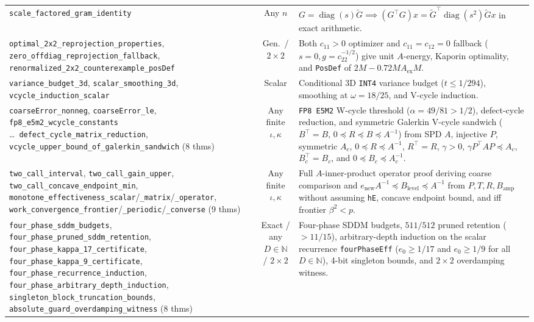 \documentclass[10pt]{article}
\begin{document}
\begin{table}[t]
\begin{tabular}{@{}p{}cp{}@{}}
\texttt{scale\_factored\_gram\_identity} & Any $n$ & $G = \operatorname{diag}(s)\tilde{G} \implies (G^\top G)x = \tilde{G}^\top\operatorname{diag}(s^2)\tilde{G}x$ in exact arithmetic. \\
\texttt{optimal\_2x2\_reprojection\_properties}, \texttt{zero\_offdiag\_reprojection\_fallback}, \texttt{renormalized\_2x2\_counterexample\_posDef} & Gen.\ / $2\times 2$ & Both $c_{11} > 0$ optimizer and $c_{11}=c_{12}=0$ fallback ($s=0, g=c_{22}^{-1/2}$) give unit $A$-energy, Kaporin optimality, and \texttt{PosDef} of $2M - 0.72 M A_{\mathrm{ex}} M$. \\
\texttt{variance\_budget\_3d}, \texttt{scalar\_smoothing\_3d}, \texttt{vcycle\_induction\_scalar} & Scalar & Conditional 3D \texttt{INT4} variance budget ($t \le 1/294$), smoothing at $\omega = 18/25$, and V-cycle induction. \\
\texttt{coarseError\_nonneg}, \texttt{coarseError\_le}, \texttt{fp8\_e5m2\_wcycle\_constants} \dots\ \texttt{defect\_cycle\_matrix\_reduction}, \texttt{vcycle\_upper\_bound\_of\_galerkin\_sandwich} (8 thms) & Any finite $\iota,\kappa$ & \texttt{FP8 E5M2} W-cycle threshold ($\alpha = 49/81 > 1/2$), defect-cycle reduction, and symmetric Galerkin V-cycle sandwich ($B^\top = B$, $0 \preceq R \preceq B \preceq A^{-1}$) from SPD $A$, injective $P$, symmetric $A_c$, $0 \preceq R \preceq A^{-1}$, $R^\top = R$, $\gamma > 0$, $\gamma P^\top A P \preceq A_c$, $B_c^\top = B_c$, and $0 \preceq B_c \preceq A_c^{-1}$. \\
\texttt{two\_call\_interval}, \texttt{two\_call\_gain\_upper}, \texttt{two\_call\_concave\_endpoint\_min}, \texttt{monotone\_effectiveness\_scalar}/\texttt{\_matrix}/\texttt{\_operator}, \texttt{work\_convergence\_frontier}/\texttt{\_periodic}/\texttt{\_converse} (9 thms) & Any finite $\iota,\kappa$ & Full $A$-inner-product operator proof deriving coarse comparison and $e_{\mathrm{new}} A^{-1} \preceq B_{\mathrm{level}} \preceq A^{-1}$ from $P, T, R, B_{\mathrm{amp}}$ without assuming \texttt{hE}, concave endpoint bound, and iff frontier $\beta^2 < p$. \\
\texttt{four\_phase\_sddm\_budgets}, \texttt{four\_phase\_pruned\_sddm\_retention}, \texttt{four\_phase\_kappa\_17\_certificate}, \texttt{four\_phase\_kappa\_9\_certificate}, \texttt{four\_phase\_recurrence\_induction}, \texttt{four\_phase\_arbitrary\_depth\_induction}, \texttt{singleton\_block\_truncation\_bounds}, \texttt{absolute\_guard\_overdamping\_witness} (8 thms) & Exact / any $D \in \mathbb{N}$ / $2\times 2$ & Four-phase SDDM budgets, $511/512$ pruned retention ($> 11/15$), arbitrary-depth induction on the scalar recurrence \texttt{fourPhaseEff} ($e_0 \ge 1/17$ and $e_0 \ge 1/9$ for all $D \in \mathbb{N}$), 4-bit singleton bounds, and $2\times 2$ overdamping witness. \\

\end{tabular}
\end{table}
\end{document}
